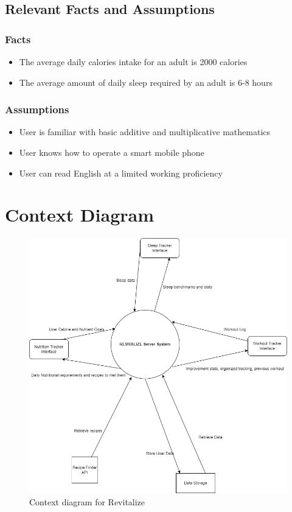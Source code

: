 \documentclass[12pt,letterpaper]{article}
\begin{document}
\subsection{Relevant Facts and Assumptions}
\subsubsection{Facts}
\begin{itemize}
	\item The average daily calories intake for an adult is 2000 calories
	\item The average amount of daily sleep required by an adult is 6-8 hours
\end{itemize}

\subsubsection{Assumptions}
\begin{itemize}
	\item User is familiar with basic additive and multiplicative mathematics
	\item User knows how to operate a smart mobile phone
	\item User can read English at a limited working proficiency
\end{itemize}
\section{Context Diagram}
\begin{figure}[H]
	\centering
	\includegraphics[scale=0.5]{cont_diag.png}
	\caption{\textcolor{black} Context diagram for Revitalize}
\end{figure}
\end{document}
